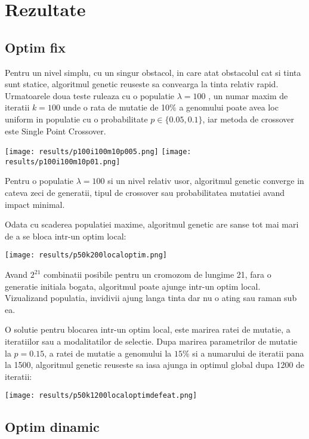 \chapter{Rezultate}
\section{Optim fix}
Pentru un nivel simplu, cu un singur obstacol, in care atat obstacolul cat si tinta sunt statice, algoritmul genetic reuseste sa convearga la tinta relativ rapid. Urmatoarele doua teste ruleaza cu o populatie $\lambda = 100$ , un numar maxim de iteratii $k = 100$ unde o rata de mutatie de 10$\%$ a genomului poate avea loc uniform in populatie cu o probabilitate  $p \in \{0.05, 0.1\}$, iar metoda de crossover este Single Point Crossover.
\begin{center}
    \texttt{[image: results/p100i100m10p005.png]}
    \linebreak
    \texttt{[image: results/p100i100m10p01.png]}
\end{center}

Pentru o populatie $ \lambda=100 $ si un nivel relativ usor, algoritmul genetic converge in cateva zeci de generatii, tipul de crossover sau probabilitatea mutatiei avand impact minimal.

Odata cu scaderea populatiei maxime, algoritmul genetic are sanse tot mai mari de a se bloca intr-un optim local:
\begin{center}
    \texttt{[image: results/p50k200localoptim.png]}
\end{center}

Avand $2^{21}$ combinatii posibile pentru un cromozom de lungime 21, fara o generatie initiala bogata, algoritmul poate ajunge intr-un optim local. Vizualizand populatia, invidivii ajung langa tinta dar nu o ating sau raman sub ea.

O solutie pentru blocarea intr-un optim local, este marirea ratei de mutatie, a iteratiilor sau a modalitatilor de selectie. Dupa marirea parametrilor de mutatie la $p=0.15$, a ratei de mutatie a genomului la $15\%$ si a numarului de iteratii pana la 1500, algoritmul genetic reuseste sa iasa ajunga in optimul global dupa 1200 de iteratii:

\begin{center}
    \texttt{[image: results/p50k1200localoptimdefeat.png]}
\end{center}

\section{Optim dinamic}

